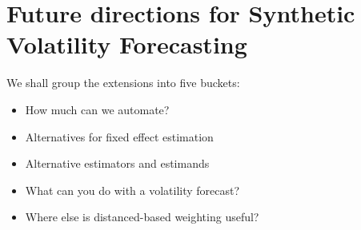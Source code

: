\documentclass[9pt]{beamer}
\theoremstyle{definition}
\begin{document}



\section{Future directions for Synthetic Volatility Forecasting}

\begin{frame}
We shall group the extensions into five buckets:
\begin{itemize}
    \item How much can we automate?
    \item Alternatives for fixed effect estimation
    \item Alternative estimators and estimands
    \item What can you do with a volatility forecast?
    \item Where else is distanced-based weighting useful?
\end{itemize}
\end{frame}
\end{document}
